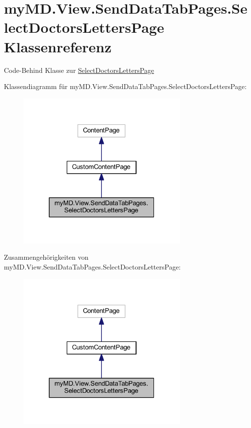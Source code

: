 \hypertarget{classmy_m_d_1_1_view_1_1_send_data_tab_pages_1_1_select_doctors_letters_page}{}\section{my\+M\+D.\+View.\+Send\+Data\+Tab\+Pages.\+Select\+Doctors\+Letters\+Page Klassenreferenz}
\label{classmy_m_d_1_1_view_1_1_send_data_tab_pages_1_1_select_doctors_letters_page}


Code-\/\+Behind Klasse zur \mbox{\hyperlink{classmy_m_d_1_1_view_1_1_send_data_tab_pages_1_1_select_doctors_letters_page}{Select\+Doctors\+Letters\+Page}}  




Klassendiagramm für my\+M\+D.\+View.\+Send\+Data\+Tab\+Pages.\+Select\+Doctors\+Letters\+Page\+:\nopagebreak
\begin{figure}[H]
\begin{center}
\leavevmode
\includegraphics[width=241pt]{classmy_m_d_1_1_view_1_1_send_data_tab_pages_1_1_select_doctors_letters_page__inherit__graph}
\end{center}
\end{figure}


Zusammengehörigkeiten von my\+M\+D.\+View.\+Send\+Data\+Tab\+Pages.\+Select\+Doctors\+Letters\+Page\+:\nopagebreak
\begin{figure}[H]
\begin{center}
\leavevmode
\includegraphics[width=241pt]{classmy_m_d_1_1_view_1_1_send_data_tab_pages_1_1_select_doctors_letters_page__coll__graph}
\end{center}
\end{figure}
